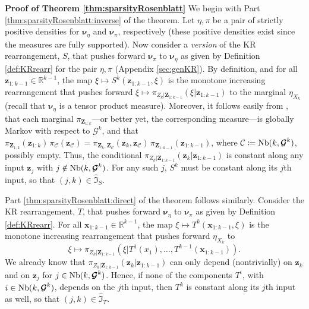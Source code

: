 \documentclass[twoside,11pt]{article}
\newcommand{\genm}{\boldsymbol{\nu} }   %
\newcommand{\re}{\mathbb{R}}
\newcommand{\Cc}{\mathcal{C}}
\newcommand{\xb}{\boldsymbol{x}}
\newcommand{\Zb}{\boldsymbol{Z}}
\newcommand{\zb}{\boldsymbol{z}}
\newcommand{\Gcb}{\boldsymbol{\mathcal{G}}}
\newcommand{\sparse}{ \mathfrak{I} }
\newcommand{\neigh}{ {\rm Nb} }
\begin{document}
 
\noindent
{\bf Proof of Theorem \ref{thm:sparsityRosenblatt}}
%
%
We begin with Part \ref{thm:sparsityRosenblatt:inverse} of the theorem.
Let $\eta,\pi$ be a pair of strictly positive densities for
$\genm_\eta$ and $\genm_\pi$, respectively 
(these positive densities exist since the measures are fully supported).
Now consider a {\it version} of the 
KR rearrangement, $S$, that pushes forward $\genm_\pi$ to $\genm_\eta$
as given by Definition \ref{def:KRrearr}
for the pair $\eta,\pi$ (Appendix \ref{sec:genKR}).
By definition, 
and for all
$\zb_{1:k-1}\in \re^{k-1}$, the map 
$\xi \mapsto S^k(\zb_{1:k-1}, \xi )$ is the %
monotone increasing 
rearrangement that pushes forward 
$\xi \mapsto \pi_{Z_k \vert \Zb_{1:k-1}}( \xi \vert \zb_{1:k-1})$ to the marginal 
$\eta_{X_k}$ (recall that $\genm_\eta$ is a tensor product measure).
Moreover, it follows easily
from \citep[Prop.~3.17]{lauritzen1996graphical}, that each
marginal $\pi_{\Zb_{1:k}}$---or better yet, the
corresponding measure---is globally Markov with 
respect to 
$\Gcb^k$, and that
$\pi_{\Zb_{1:k}}(\zb_{1:k})\,\pi_{\Cc}(\zb_{\Cc}) = 
\pi_{ \Zb_k , \Zb_\Cc }( \zb_k, \zb_{\Cc} ) \, \pi_{\Zb_{1:k-1}}(\zb_{1:k-1})$, where
$\Cc \coloneqq \neigh( k , \Gcb^k)$, possibly empty.
%
%
Thus, the conditional $\pi_{Z_k \vert \Zb_{1:k-1}}( \zb_k \vert \zb_{1:k-1})$
is constant along any input $\zb_j$  with $j \notin \neigh (k, \Gcb^k) $.
For any such $j$, $S^k$ must be constant along its $j$th input, so
that $(j,k)\in \widehat{\sparse}_S$.

Part \ref{thm:sparsityRosenblatt:direct} of the theorem follows similarly.
Consider the KR rearrangement, $T$, that pushes forward $\genm_\eta$ to 
$\genm_\pi$ as given by Definition \ref{def:KRrearr}.
For all
$\xb_{1:k-1}\in \re^{k-1}$, the map 
$\xi \mapsto T^k(\xb_{1:k-1}, \xi )$ is the 
%
monotone increasing 
rearrangement that pushes forward 
$\eta_{X_k}$ to
\begin{equation}
\xi \mapsto \pi_{Z_k \vert \Zb_{1:k-1}}( \xi \vert 
T^1(x_1),\ldots,T^{k-1}(\xb_{1:k-1})).  
\end{equation}
We already know that 
$\pi_{Z_k \vert \Zb_{1:k-1}}( \zb_k \vert \zb_{1:k-1})$ can
only depend (nontrivially) on $\zb_k$ and on 
$\zb_j$ for $j \in \neigh (k, \Gcb^k)$.
Hence, if none of the components $T^i$, with $i\in \neigh (k, \Gcb^k)$,
depends on the $j$th input, then 
$T^k$ is constant along its
%
$j$th
input as well,
%
%
so that $(j,k)\in \widehat{\sparse}_T$.

%

%
%
%
%
%
%
%
%
%
%
%
%
%
%
%
%
%
%
%
\end{document}
